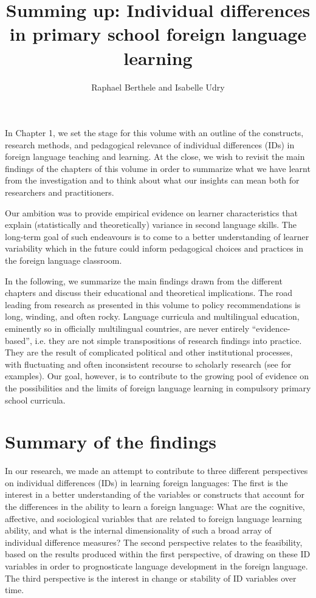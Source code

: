 \documentclass[output=paper]{langsci/langscibook}
\author{Raphael Berthele\orcid{}\affiliation{University of Fribourg, Institut de Plurilinguisme} and Isabelle Udry\orcid{}\affiliation{University of Fribourg, Institut de Plurilinguisme; Zurich University of Teacher Education}}
\title[Summing up]
      {Summing up: Individual differences in primary school foreign language learning}
\begin{document}
\maketitle 

\noindent In Chapter 1, we set the stage for this volume with an outline of the constructs, research methods, and pedagogical relevance of individual differences (IDs) in foreign language teaching and learning. At the close, we wish to revisit the main findings of the chapters of this volume in order to summarize what we have learnt from the investigation and to think about what our insights can mean both for researchers and practitioners.

Our ambition was to provide empirical evidence on learner characteristics that explain (statistically and theoretically) variance in second language skills. The long-term goal of such endeavours is to come to a better understanding of learner variability which in the future could inform pedagogical choices and practices in the foreign language classroom.

In the following, we summarize the main findings drawn from the different chapters and discuss their educational and theoretical implications. The road leading from research as presented in this volume to policy recommendations is long, winding, and often rocky. Language curricula and multilingual education, eminently so in officially multilingual countries, are never entirely ``evidence-based'', i.e. they are not simple transpositions of research findings into practice. They are the result of complicated political and other institutional processes, with fluctuating and often inconsistent recourse to scholarly research (see \citealt{berthele2019} for examples). Our goal, however, is to contribute to the growing pool of evidence on the possibilities and the limits of foreign language learning in compulsory primary school curricula.

\section{Summary of the findings}

In our research, we made an attempt to contribute to three different perspectives on individual differences (IDs) in learning foreign languages: The first is the interest in a better understanding of the variables or constructs that account for the differences in the ability to learn a foreign language: What are the cognitive, affective, and sociological variables that are related to foreign language learning ability, and what is the internal dimensionality of such a broad array of individual difference measures? The second perspective relates to the feasibility, based on the results produced within the first perspective, of drawing on these ID variables in order to prognosticate language development in the foreign language. The third perspective is the interest in change or stability of ID variables over time.
\end{document}
